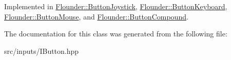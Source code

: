 Implemented in \hyperlink{class_flounder_1_1_button_joystick_ac5d6de45e62a7c38a328f217b89573e1}{Flounder\+::\+Button\+Joystick}, \hyperlink{class_flounder_1_1_button_keyboard_a67f15c721a2e7afdf6594c6912a8e664}{Flounder\+::\+Button\+Keyboard}, \hyperlink{class_flounder_1_1_button_mouse_ae64500e920907de796d8e57a07c9fef0}{Flounder\+::\+Button\+Mouse}, and \hyperlink{class_flounder_1_1_button_compound_a89f7e5a22a14d10a02974955f3fac8d1}{Flounder\+::\+Button\+Compound}.



The documentation for this class was generated from the following file\+:\begin{DoxyCompactItemize}
\item 
src/inputs/I\+Button.\+hpp\end{DoxyCompactItemize}

